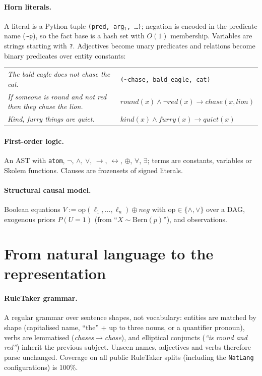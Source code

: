 \documentclass[10pt,a4paper]{article}
\begin{document}
\paragraph{Horn literals.} A literal is a Python tuple \texttt{(pred, arg$_1$, \dots)}; negation is encoded in the predicate name (\texttt{\~{}p}), so the fact base is a hash set with $O(1)$ membership. Variables are strings starting with \texttt{?}. Adjectives become unary predicates and relations become binary predicates over entity constants:
\begin{center}\small
\begin{tabular}{@{}ll@{}}
\emph{The bald eagle does not chase the cat.} & \texttt{(\~{}chase, bald\_eagle, cat)} \\
\emph{If someone is round and not red then they chase the lion.} & $\mathit{round}(x)\wedge\neg\mathit{red}(x)\rightarrow \mathit{chase}(x,\mathit{lion})$ \\
\emph{Kind, furry things are quiet.} & $\mathit{kind}(x)\wedge\mathit{furry}(x)\rightarrow\mathit{quiet}(x)$
\end{tabular}
\end{center}

\paragraph{First-order logic.} An AST with \texttt{atom}, $\neg$, $\wedge$, $\vee$, $\rightarrow$, $\leftrightarrow$, $\oplus$, $\forall$, $\exists$; terms are constants, variables or Skolem functions. Clauses are frozensets of signed literals.

\paragraph{Structural causal model.} Boolean equations $V := \mathrm{op}(\ell_1,\dots,\ell_n) \oplus \mathit{neg}$ with $\mathrm{op}\in\{\wedge,\vee\}$ over a DAG, exogenous priors $P(U{=}1)$ (from ``$X\sim\mathrm{Bern}(p)$''), and observations.

\section{From natural language to the representation}
\paragraph{RuleTaker grammar.} A regular grammar over sentence shapes, not vocabulary: entities are matched by shape (capitalised name, ``the'' + up to three nouns, or a quantifier pronoun), verbs are lemmatised (\emph{chases}$\rightarrow$\emph{chase}), and elliptical conjuncts (\emph{``is round and red''}) inherit the previous subject. Unseen names, adjectives and verbs therefore parse unchanged. Coverage on all public RuleTaker splits (including the \texttt{NatLang} configurations) is 100\%.
\end{document}
